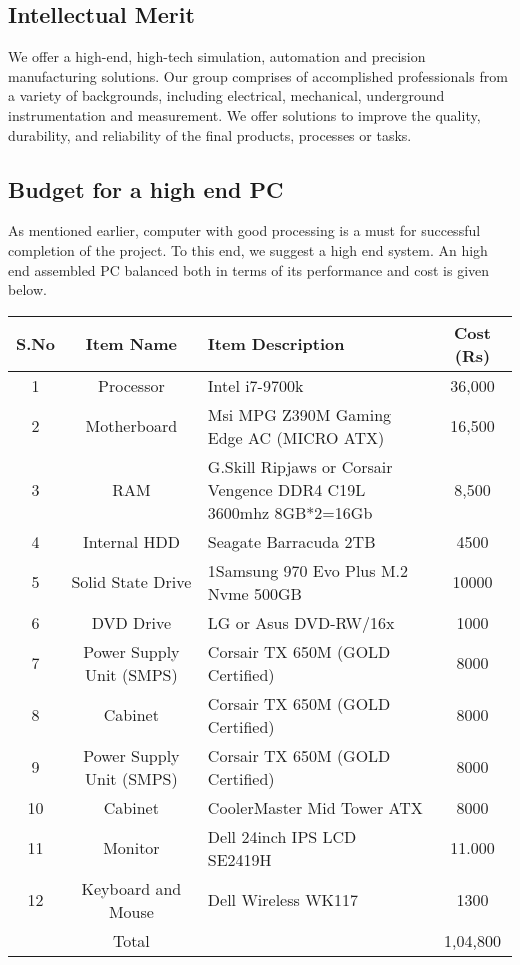 \documentclass{FR16}
\begin{document}
\subsection{Intellectual Merit}
We offer a high-end, high-tech simulation, automation and precision  manufacturing solutions. Our group comprises of accomplished professionals from a variety of backgrounds, including electrical, mechanical,  underground instrumentation and measurement. We offer solutions to improve the quality, durability, and reliability of the final products, processes or tasks. 

\newpage
\subsection{Budget for a high end PC }
As mentioned earlier, computer with good processing is a must for successful completion of the project. To this end, we suggest a high end system. An high end assembled PC balanced both in terms of its performance and cost is given below.
\begin{center}
\begin{tabular}[h]{||c ||c|| p{6 cm}|| c|| }
\arrayrulecolor{Azzurro}
\hline
\hline
{\bfseries S.No} & {\bfseries Item Name}& {\bfseries Item Description} & {\bfseries Cost (Rs)} \\
\hline
\hline
1 & Processor & Intel i7-9700k & 36,000\\
\hline
\hline
2 &Motherboard & Msi MPG Z390M Gaming Edge AC  (MICRO ATX) & 16,500  \\
\hline
\hline
3 &RAM & G.Skill Ripjaws or Corsair Vengence DDR4 C19L 3600mhz 8GB*2=16Gb & 8,500\\ 
\hline 
\hline
4 &Internal HDD & Seagate Barracuda 2TB & 4500\\ 
\hline
\hline
5 &Solid State Drive & 1Samsung 970 Evo Plus M.2 Nvme 500GB  & 10000\\
\hline
\hline
6 &DVD Drive & LG or Asus DVD-RW/16x & 1000\\
\hline
\hline
7 &Power Supply Unit (SMPS) &  Corsair TX 650M (GOLD Certified) & 8000\\
\hline
\hline
8 &Cabinet &  Corsair TX 650M (GOLD Certified) & 8000\\
\hline
\hline
9 &Power Supply Unit (SMPS) &  Corsair TX 650M (GOLD Certified)  & 8000\\
\hline
\hline
10 &Cabinet &  CoolerMaster Mid Tower ATX  & 8000\\
\hline
\hline
11 &Monitor &  Dell 24inch IPS LCD SE2419H  & 11.000\\
\hline
\hline
12 &Keyboard and Mouse &  Dell Wireless WK117  & 1300\\
\hline
\hline
 & Total & & 1,04,800
 
 \end{tabular}
\end{center}
\end{document}
